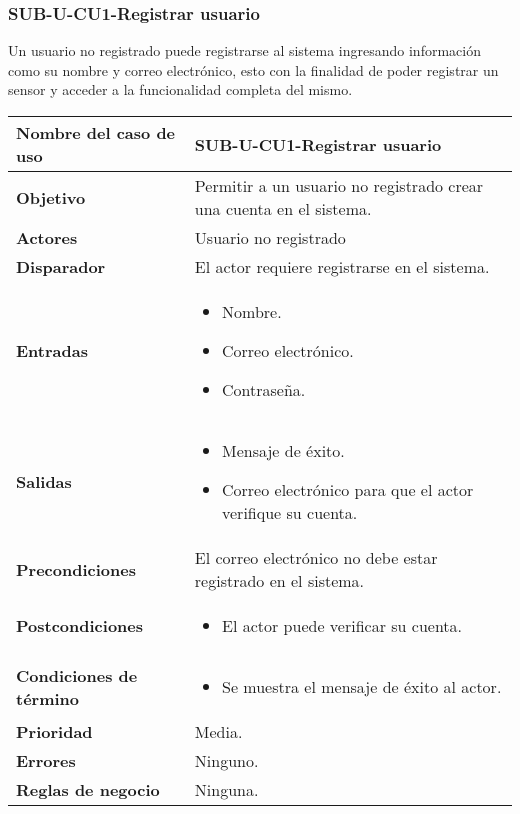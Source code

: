 \subsubsection{SUB-U-CU1-Registrar usuario}\label{SUB-U-CU1}
Un usuario no registrado puede registrarse al sistema ingresando información como su nombre y correo electrónico, esto con la finalidad de poder registrar un sensor y acceder a la funcionalidad completa del mismo.

\begin{longtable}{|J{5cm}|J{10.3cm}|}
	\hline
	\textbf{Nombre del caso de uso} &
		SUB-U-CU1-Registrar usuario \\ \hline
	\textbf{Objetivo} &
		Permitir a un usuario no registrado crear una cuenta en el sistema. \\ \hline
	\textbf{Actores} &
		Usuario no registrado \\ \hline 
	\textbf{Disparador} & 
		El actor requiere registrarse en el sistema. \\ \hline 
	\textbf{Entradas} & 
		\begin{itemize}
				\item Nombre.
				\item Correo electrónico.
				\item Contraseña.
		\end{itemize}\\ \hline 
	\textbf{Salidas} & 
		\begin{itemize}
			\item Mensaje de éxito.
			\item Correo electrónico para que el actor verifique su cuenta.
		\end{itemize} \\ \hline
	\textbf{Precondiciones} &
		El correo electrónico no debe estar registrado en el sistema.\\ \hline
	\textbf{Postcondiciones} &
		\begin{itemize}
			\item El actor puede verificar su cuenta.
		\end{itemize} \\ \hline
	\textbf{Condiciones de término} & 
		\begin{itemize}
			\item Se muestra el mensaje de éxito al actor.
		\end{itemize} \\ \hline 
	\textbf{Prioridad} & 
		Media. \\ \hline
	\textbf{Errores} & Ninguno.
		\\ \hline
	\textbf{Reglas de negocio} & Ninguna.
		 \\ \hline
\end{longtable}

